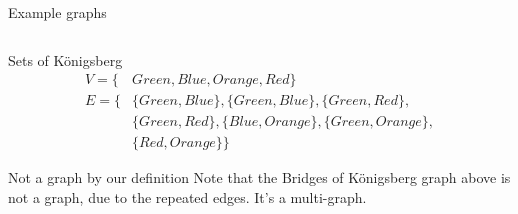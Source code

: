 \begin{frame}{Example graphs}
\begin{columns}
		\begin{column}{0.45\textwidth}
			\begin{center}
				\begin{adjustbox}{max width={0.9\textwidth}, center}
				\end{adjustbox}
			\end{center}
		\end{column}
				\begin{column}{0.45\textwidth}
			\begin{center}
				\begin{adjustbox}{max width={0.9\textwidth}, center}
				\end{adjustbox}
			\end{center}
		\end{column}
	\end{columns}
\end{frame}


\begin{frame}{Sets of K{\"o}nigsberg}
	\begin{align*}
		V = \{&Green, Blue, Orange, Red\} \\[5mm]
		E = \{&\{Green, Blue\}, \{Green, Blue\}, \{Green, Red\},\\
				&\{Green, Red\}, \{Blue, Orange\}, \{Green, Orange\},\\
				&\{Red, Orange\}\}
	\end{align*}

	\begin{alertblock}{Not a graph by our definition}
	Note that the Bridges of K{\"o}nigsberg graph above is not a graph, due to the repeated edges.
	It's a multi-graph.
	\end{alertblock}
\end{frame}


